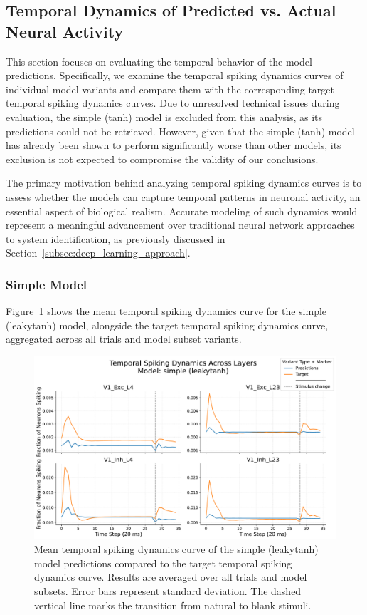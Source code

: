 \subsection{Temporal Dynamics of Predicted vs. Actual Neural Activity}
\label{subsec:prediction_target_comparison_variants}

This section focuses on evaluating the temporal behavior of the model predictions. Specifically, we examine the temporal spiking dynamics curves of individual model variants and compare them with the corresponding target temporal spiking dynamics curves. Due to unresolved technical issues during evaluation, the simple (tanh) model is excluded from this analysis, as its predictions could not be retrieved. However, given that the simple (tanh) model has already been shown to perform significantly worse than other models, its exclusion is not expected to compromise the validity of our conclusions.

The primary motivation behind analyzing temporal spiking dynamics curves is to assess whether the models can capture temporal patterns in neuronal activity, an essential aspect of biological realism. Accurate modeling of such dynamics would represent a meaningful advancement over traditional neural network approaches to system identification, as previously discussed in Section~\ref{subsec:deep_learning_approach}.

\subsubsection{Simple Model}
\label{{subsubsec:simpl_leakytanh_eval}}

Figure~\ref{fig:synchrony_curve_simple_leaky_tanh} shows the mean temporal spiking dynamics curve for the simple (leakytanh) model, alongside the target temporal spiking dynamics curve, aggregated across all trials and model subset variants.

\begin{figure}
    \centering
    \includegraphics[width=\linewidth]{img/plots/separate_model_synchrony_curve_simple_evaluation_new.pdf}
    \caption{Mean temporal spiking dynamics curve of the simple (leakytanh) model predictions compared to the target temporal spiking dynamics curve. Results are averaged over all trials and model subsets. Error bars represent standard deviation. The dashed vertical line marks the transition from natural to blank stimuli.}
    \label{fig:synchrony_curve_simple_leaky_tanh}
\end{figure}


